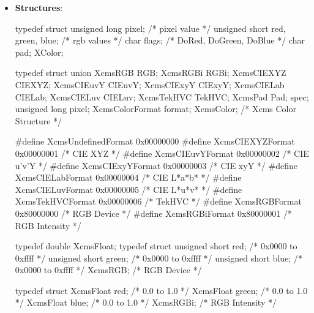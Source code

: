 \documentclass{report}
\begin{document}
    \pagebreak 
    \begin{itemize}
        \item \textbf{Structures}: 
            \begin{cppcode}
                typedef struct {
                    unsigned long pixel; /* pixel value */
                    unsigned short red, green, blue; /* rgb values */
                    char flags; /* DoRed, DoGreen, DoBlue */
                    char pad;
                } XColor;
            \end{cppcode}
            \begin{cppcode}
                typedef struct {
                    union {
                        XcmsRGB RGB;
                        XcmsRGBi RGBi;
                        XcmsCIEXYZ CIEXYZ;
                        XcmsCIEuvY CIEuvY;
                        XcmsCIExyY CIExyY;
                        XcmsCIELab CIELab;
                        XcmsCIELuv CIELuv;
                        XcmsTekHVC TekHVC;
                        XcmsPad Pad;
                    } spec;
                    unsigned long pixel;
                    XcmsColorFormat format;
                } XcmsColor; /* Xcms Color Structure */
            \end{cppcode}
            \begin{cppcode}
                #define XcmsUndefinedFormat 0x00000000
                #define XcmsCIEXYZFormat 0x00000001 /* CIE XYZ */
                #define XcmsCIEuvYFormat 0x00000002 /* CIE u’v’Y */
                #define XcmsCIExyYFormat 0x00000003 /* CIE xyY */
                #define XcmsCIELabFormat 0x00000004 /* CIE L*a*b* */
                #define XcmsCIELuvFormat 0x00000005 /* CIE L*u*v* */
                #define XcmsTekHVCFormat 0x00000006 /* TekHVC */
                #define XcmsRGBFormat 0x80000000 /* RGB Device */
                #define XcmsRGBiFormat 0x80000001 /* RGB Intensity */
            \end{cppcode}
            \begin{cppcode}
                typedef double XcmsFloat;
                typedef struct {
                    unsigned short red; /* 0x0000 to 0xffff */
                    unsigned short green; /* 0x0000 to 0xffff */
                    unsigned short blue; /* 0x0000 to 0xffff */
                } XcmsRGB; /* RGB Device */

                typedef struct {
                    XcmsFloat red; /* 0.0 to 1.0 */
                    XcmsFloat green; /* 0.0 to 1.0 */
                    XcmsFloat blue; /* 0.0 to 1.0 */
                } XcmsRGBi; /* RGB Intensity */


\end{cppcode}
\end{itemize}
\end{document}
